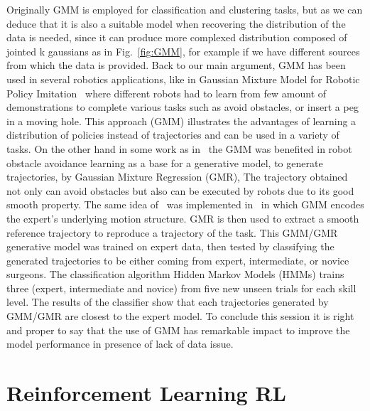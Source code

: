 \vspace{10pt} 
Originally GMM is employed for classification and clustering tasks, but as we can deduce that it is also a suitable model when recovering the distribution of the data is needed, since it can produce more complexed distribution composed of jointed k gaussians as in Fig.~\ref{fig:GMM}, for example if we have different sources from which the data is provided. Back to our main argument, GMM has been used in several robotics applications, like in Gaussian Mixture Model for Robotic Policy Imitation~\cite{pignat2019bayesian} where different robots had to learn from few amount of demonstrations to complete various tasks such as avoid obstacles, or insert a peg in a moving hole. This approach (GMM) illustrates the advantages of learning a distribution of policies instead of trajectories and can be used in a variety of tasks. On the other hand in some work as in~\cite{zhang2016robot} the GMM was benefited in robot obstacle avoidance learning as a base for a generative model, to generate trajectories, by Gaussian Mixture Regression (GMR), The trajectory obtained not only can avoid obstacles but also can be executed by robots due to its good smooth property. The same idea of~\cite{zhang2016robot} was implemented in~\cite{reiley2010motion} in which GMM encodes the expert’s underlying motion structure. GMR is then used to extract a smooth reference trajectory to reproduce a trajectory of the task. This GMM/GMR generative model was trained on expert data, then tested by classifying the generated trajectories  to be either coming from expert, intermediate, or novice surgeons. The classification algorithm Hidden Markov Models (HMMs) trains three (expert, intermediate and novice) from five new unseen trials for each skill level. The results of the classifier show that each trajectories generated by GMM/GMR are closest to the expert model. To conclude this session it is right and proper to say that the use of GMM has remarkable impact to improve the model performance in presence of lack of data issue.


\section{Reinforcement Learning RL}

